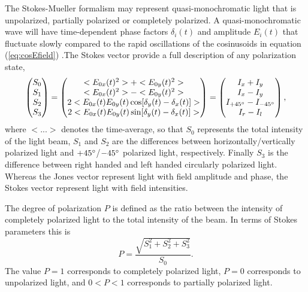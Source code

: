 The Stokes-Mueller formalism may represent quasi-monochromatic light that is unpolarized, partially polarized or completely polarized. A quasi-monochromatic wave will have time-dependent phase factors $\delta_i(t)$ and amplitude $E_i(t)$ that fluctuate slowly compared to the rapid oscillations of the cosinusoids in equation (\ref{eq:cosEfield}) \cite{collett}.The Stokes vector provide a full description of any polarization state\cite{azzam},
\begin{equation}
    \begin{pmatrix}
        S_0 \\
        S_1 \\
        S_2 \\
        S_3
    \end{pmatrix}
    =
    \begin{pmatrix}
        <E_{0x}(t)^2> + <E_{0y}(t)^2> \\
        <E_{0x}(t)^2> - <E_{0y}(t)^2> \\
        2<E_{0x}(t)E_{0y}(t)\cos[\delta_y(t) - \delta_x(t)]> \\
        2<E_{0x}(t)E_{0y}(t)\sin[\delta_y(t) - \delta_x(t)]>
    \end{pmatrix}
    =
    \begin{pmatrix}
        I_x + I_y \\
        I_x - I_y \\
        I_{+45\degree} - I_{-45\degree} \\
        I_r - I_l
    \end{pmatrix},
    \label{eq:StokesVector}
\end{equation}
where $<...>$ denotes the time-average, so that $S_0$ represents the total intensity of the light beam, $S_1$ and $S_2$ are the differences between horizontally/vertically polarized light and $+45\degree$/$-45\degree$ polarized light, respectively. Finally $S_3$ is the difference between right handed and left handed circularly polarized light.
Whereas the Jones vector represent light with field amplitude and phase, the Stokes vector represent light with field intensities.

The degree of polarization $P$ is defined as the ratio between the intensity of completely polarized light to the total intensity of the beam. In terms of Stokes parameters this is 
\begin{equation}
    P = \frac{\sqrt{S_1^2 + S_2^2 + S_3^2}}{S_0}.
\end{equation}
The value $P=1$ corresponds to completely polarized light, $P=0$ corresponds to unpolarized light, and $0<P<1$ corresponds to partially polarized light.


